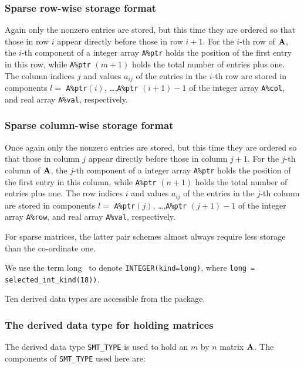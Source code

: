 \documentclass{galahad}
\begin{document}
\subsubsection{Sparse row-wise storage format}\label{rowwise}
Again only the nonzero entries are stored, but this time
they are ordered so that those in row $i$ appear directly before those
in row $i+1$. For the $i$-th row of ${\mathbf{A}}$, the $i$-th component of a
integer array {\tt A\%ptr} holds the position of the first entry in this row,
while {\tt A\%ptr} $(m+1)$ holds the total number of entries plus one.
The column indices $j$ and values $a_{ij}$ of the entries in the $i$-th row
are stored in components
$l =$ {\tt A\%ptr}$(i)$, \ldots ,{\tt A\%ptr} $(i+1)-1$ of the
integer array {\tt A\%col}, and real array {\tt A\%val}, respectively.

\subsubsection{Sparse column-wise storage format}\label{columnwise}
Once again only the nonzero entries are stored, but this time
they are ordered so that those in column $j$ appear directly before those
in column $j+1$. For the $j$-th column of ${\mathbf{A}}$, the $j$-th component of a
integer array {\tt A\%ptr} holds the position of the first entry in this column,
while {\tt A\%ptr} $(n+1)$ holds the total number of entries plus one.
The row indices $i$ and values $a_{ij}$ of the entries in the $j$-th column
are stored in components
$l =$ {\tt A\%ptr}$(j)$, \ldots ,{\tt A\%ptr} $(j+1)-1$ of the
integer array {\tt A\%row}, and real array {\tt A\%val}, respectively.

For sparse matrices, the latter pair schemes almost always require less
storage than the co-ordinate one.


\galintkinds
We use the term
long \integer\ to denote {\tt INTEGER\-(kind=long)}, where
{\tt long = selected\_int\_kind(18))}.





\galtypes
Ten derived data types are accessible from the package.


\subsubsection{The derived data type for holding matrices}\label{typesmt}
The derived data type {\tt SMT\_TYPE} is used to hold an $m$ by $n$ 
matrix ${\mathbf{A}}$. The components of {\tt SMT\_TYPE} used here are:
\end{document}
